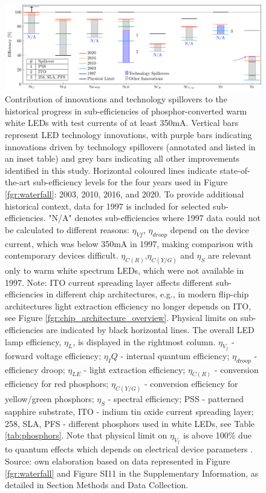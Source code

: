 \documentclass[journal=jacsat,manuscript=article]{achemso}
\begin{document}
\begin{figure}[h!]
 \centering
 \includegraphics[width=\textwidth]{figures/breakthroughs_efficiency.pdf}
 \caption{Contribution of innovations and technology spillovers to the historical progress in sub-efficiencies of phosphor-converted warm white LEDs with test currents of at least 350mA. Vertical bars represent LED technology innovations, with purple bars indicating innovations driven by technology spillovers (annotated and listed in an inset table) and grey bars indicating all other improvements identified in this study. Horizontal coloured lines indicate state-of-the-art sub-efficiency levels for the four years used in Figure \ref{fgr:waterfall}: 2003, 2010, 2016, and 2020. To provide additional historical context, data for 1997 is included for selected sub-efficiencies. "N/A" denotes sub-efficiencies where 1997 data could not be calculated to different reasons: $\eta_{Vf}$, $\eta_{droop}$ depend on the device current, which was below 350mA in 1997, making comparison with contemporary devices difficult. $\eta_{C(R)}$,$\eta_{C(Y/G)}$ and $\eta_S$ are relevant only to warm white spectrum LEDs, which were not available in 1997. Note: ITO current spreading layer affects different sub-efficiencies in different chip architectures, e.g., in modern flip-chip architectures light extraction efficiency no longer depends on ITO, see Figure \ref{fgr:chip_architecture_overview}. Physical limits on sub-efficiencies are indicated by black horizontal lines. The overall LED lamp efficiency, $\eta_L$, is displayed in the rightmost column. $\eta_{V_f}$ - forward voltage efficiency; $\eta_IQ$ - internal quantum efficiency; $\eta_{droop}$ - efficiency droop; $\eta_{LE}$ - light extraction efficiency; $\eta_{C(R)}$ - conversion efficiency for red phosphors; $\eta_{C(Y/G)}$ - conversion efficiency for yellow/green phosphors; $\eta_S$ - spectral efficiency; PSS - patterned sapphire substrate, ITO - indium tin oxide current spreading layer; 258, SLA, PFS - different phosphors used in white LEDs, see Table \ref{tab:phosphors}.  Note that physical limit on $\eta_{V_f}$ is above 100\% due to quantum effects which depends on electrical device parameters \cite{david2016electrical}. Source: own elaboration based on data represented in Figure \ref{fgr:waterfall} and Figure SI11 in the Supplementary Information, as detailed in Section Methods and Data Collection.}
 \label{fgr:breakthroughs_efficiency}
\end{figure}
\end{document}
